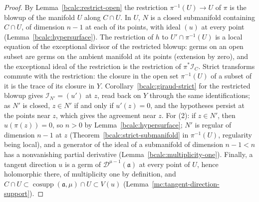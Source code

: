 \begin{proof}
\mixedleanok
By Lemma~\ref{bcalc:restrict-open} the restriction \(\pi^{-1}(U)\to U\) of \(\pi\) is the blowup of the manifold \(U\) along \(C\cap U\). In \(U\),
\(N\) is a closed submanifold containing \(C\cap U\), of dimension \(n-1\) at each of its points, with ideal \((u)\) at every point
(Lemma~\ref{bcalc:hypersurface}). The restriction of \(h\) to \(U'\cap\pi^{-1}(U)\) is a local equation of the exceptional divisor of the restricted
blowup: germs on an open subset are germs on the ambient manifold at its points (extension by zero), and the exceptional ideal of the
restriction is the restriction of \(\pi^*\mathcal I_C\). Strict transforms commute with the restriction: the closure in the open set
\(\pi^{-1}(U)\) of a subset of it is the trace of its closure in \(Y\). Corollary~\ref{bcalc:giraud-strict} for the restricted blowup gives
\(\mathcal I_{N'}=(u')\) at \(z\), read back on \(Y\) through the same identifications; as \(N'\) is closed, \(z\in N'\) if and only if \(u'(z)=0\), and
the hypotheses persist at the points near \(z\), which gives the agreement near \(z\). For (2): if \(z\in N'\), then \(u(\pi(z))=0\), so \(n>0\) by
Lemma~\ref{bcalc:hypersurface}; \(N'\) is regular of dimension \(n-1\) at \(z\) (Theorem~\ref{bcalc:strict-submanifold} in \(\pi^{-1}(U)\), regularity
being local), and a generator of the ideal of a submanifold of dimension \(n-1<n\) has a nonvanishing partial derivative
(Lemma~\ref{bcalc:multiplicity-one}). Finally, a tangent direction \(u\) is a germ of \(\mathcal D^{\mu-1}(\mathfrak a)\) at every point of \(U\), hence
holomorphic there, of multiplicity one by definition, and \(C\cap U\subset\operatorname{cosupp}(\mathfrak a,\mu)\cap U\subset V(u)\)
(Lemma~\ref{mc:tangent-direction-support}).
\end{proof}

